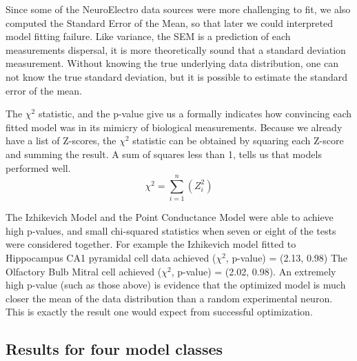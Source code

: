 Since some of the NeuroElectro data sources were more challenging to fit, we also computed the Standard Error of the Mean, so that later we could interpreted model fitting failure. Like variance, the SEM is a prediction of each measurements dispersal, it is more theoretically sound that a standard deviation measurement. Without knowing the true underlying data distribution, one can not know the true standard deviation, but it is possible to estimate the standard error of the mean. 

The $\chi^{2}$ statistic, and the p-value give us a formally indicates how convincing each fitted model was in its mimicry of biological measurements.
Because we already have a list of Z-scores, the $\chi^{2}$ statistic can be obtained by squaring each Z-score and summing the result. A sum of squares less than 1, tells us that models performed well.
\begin{equation}
\chi^{2}=\sum\limits_{i=1}^{n}(Z_{i}^{2})
\end{equation}




The Izhikevich Model and the Point Conductance Model were able to achieve high p-values, and small chi-squared statistics when seven or eight of the tests were considered together.
For example the Izhikevich model fitted to Hippocampus CA1 pyramidal cell data achieved ($\chi^2$, p-value) = (2.13, 0.98)
The Olfactory Bulb Mitral cell achieved ($\chi^2$, p-value) = (2.02, 0.98).
An extremely high p-value (such as those above) is evidence that the optimized model is much closer the mean of the data distribution than a random experimental neuron.
This is exactly the result one would expect from successful optimization.

\subsection{Results for four model classes}

